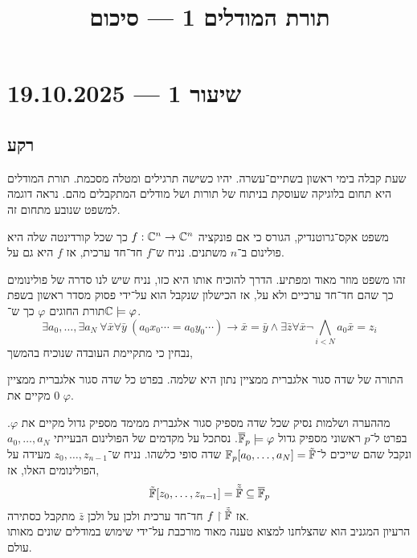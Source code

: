 
\title{תורת המודלים 1 --- סיכום}
\setcounter{secnumdepth}{2}

\usepackage{fancyhdr}
\pagestyle{fancy}
\renewcommand{\headrulewidth}{0pt}


\maketitle
\maketitleprint[purple]

\tableofcontents

\section{שיעור 1 --- 19.10.2025}
\subsection{רקע}
שעת קבלה בימי ראשון בשתיים־עשרה.
יהיו כשישה תרגילים ומטלה מסכמת.
תורת המודלים היא תחום בלוגיקה שעוסקת בניתוח של תורות ושל מודלים המתקבלים מהם.
נראה דוגמה למשפט שנובע מתחום זה.
\begin{example}
	משפט אקס־גרוטנדיק, הגורס כי אם פונקציה $f : \mathbb{C}^n \to \mathbb{C}^n$ כך שכל קורדינטה שלה היא פולינום ב־$n$ משתנים.
	נניח ש־$f$ חד־חד ערכית, אז $f$ היא גם על.
\end{example}
זהו משפט מוזר מאוד ומפתיע.
הדרך להוכיח אותו היא כזו,
נניח שיש לנו סדרה של פולינומים כך שהם חד־חד ערכיים ולא על, אז הכישלון שנקבל הוא על־ידי פסוק מסדר ראשון בשפת תורת החוגים $\varphi$ כך ש־$\mathbb{C} \models \varphi$.
\[
	\exists a_0, \ldots, \exists a_{N}\ \forall \bar{x} \forall \bar{y}\ (a_0 x_0 \cdots = a_0 y_0 \cdots) \to \bar{x} = \bar{y}
	\land \exists \bar{z} \forall \bar{x} \lnot \bigwedge_{i < N} a_0 \bar{x} = z_i
\]
נבחין כי מתקיימת העובדה שנוכיח בהמשך,
\begin{remark}
	התורה של שדה סגור אלגברית ממציין נתון היא שלמה.
	בפרט כל שדה סגור אלגברית ממציין 0 מקיים את $\varphi$.
\end{remark}
מההערה ושלמות נסיק שכל שדה מספיק סגור אלגברית ממימד מספיק גדול מקיים את $\varphi$.
בפרט ל־$p$ ראשוני מספיק גדול $\overline{\mathbb{F}}_p \models \varphi$.
נסתכל על מקדמים של הפולינום הבעייתי $a_0, \ldots, a_{N}$ ונקבל שהם שייכים ל־$\mathbb{F}_p[a_0, \ldots, a_{N}] = \tilde{\mathbb{F}}$ שדה סופי כלשהו.
נניח ש־$z_{0}, \ldots, z_{n - 1}$ מעידה על הפולינומים האלו, אז,
\[
	\tilde{\mathbb{F}}[z_0, \ldots, z_{n - 1}] = \tilde{\tilde{\mathbb{F}}} \subseteq \overline{\mathbb{F}}_p 
\]
אז $f \restriction \tilde{\tilde{\mathbb{F}}}$ חד־חד ערכית ולכן על ולכן $\bar{z}$ מתקבל כסתירה. \\
הרעיון המגניב הוא שהצלחנו למצוא טענה מאוד מורכבת על־ידי שימוש במודלים שונים מאותו עולם.

